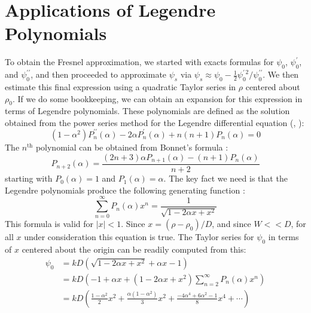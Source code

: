 \documentclass{article}
\theoremstyle{plain}
\begin{document}
    \section{Applications of Legendre Polynomials}
        To obtain the Fresnel approximation, we started with exacts formulas
        for $\psi_{0}$, $\psi^{\prime}_{0}$, and $\psi^{\prime\prime}_{0}$,
        and then proceeded to approximate $\psi_{s}$ via
        $%
            \psi_{s}\approx%
            \psi_{0}-\frac{1}{2}\psi^{\prime\,2}_{0}/\psi^{\prime\prime}_{0}%
        $.
        We then estimate this final expression using a quadratic
        Taylor series in $\rho$ centered about $\rho_{0}$. If we do some
        bookkeeping, we can obtain an expansion for this expression in terms of
        Legendre polynomials. These polynomials are defined as the
        solution obtained from the power series method for the Legendre
        differential equation
        (\cite[Eqn.~8.1.1]{AbramowitzAndStegun},
        \cite[Ch.~5.2]{MorseFeshbachTheoreticalPhysics}):
        \begin{equation}
            (1-\alpha^{2})P^{\prime\prime}_{n}(\alpha)
            -2\alpha{P}^{\prime}_{n}(\alpha)
            +n(n+1)P_{n}(\alpha)=0
        \end{equation}
        The $n^{\textrm{th}}$ polynomial can be obtained from Bonnet's formula
        \cite[p.~267 Thm.~V]{BonnetRecursionFormula}:
        \begin{equation}
            \label{eqn:bonnet_recursion}
            P_{n+2}(\alpha)
            =\frac{(2n+3)\alpha{P}_{n+1}(\alpha)-(n+1)P_{n}(\alpha)}{n+2}
        \end{equation}
        starting with $P_{0}(\alpha)=1$ and $P_{1}(\alpha)=\alpha$.
        The key fact we need is that the Legendre polynomials produce
        the following generating function
        \cite[Eqn.~12.27]{ArfkenWeberMathematicalPhysics}:
        \begin{equation}
            \sum_{n=0}^{\infty}P_{n}(\alpha)x^{n}
            =\frac{1}{\sqrt{1-2\alpha{x}+x^{2}}}
        \end{equation}
        This formula is valid for $|x|<1$. Since $x=(\rho-\rho_{0})/D$, and
        since $W<<D$, for all $x$ under consideration this equation is true.
        The Taylor series for $\psi_{0}$ in terms of $x$ centered about
        the origin can be readily computed from this:
        \begin{subequations}
            \begin{align}
                \psi_{0}
                &=kD\left(\sqrt{1-2\alpha{x}+x^{2}}+\alpha{x}-1\right)\\
                &=kD\left(
                    -1+\alpha{x}+
                    (1-2\alpha{x}+x^{2})\sum_{n=2}^{\infty}P_{n}(\alpha)x^{n}
                \right)\\
                &=kD\left(
                    \frac{1-\alpha^{2}}{2}x^{2}
                    +\frac{\alpha(1-\alpha^{2})}{3}x^{2}
                    +\frac{-4\alpha^{4}+6\alpha^{2}-1}{8}x^{4}
                    +\cdots
                \right)
            \end{align}
        \end{subequations}
\end{document}
